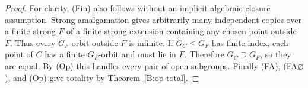 \begin{proof}
For clarity, (Fin) also follows without an implicit algebraic-closure
assumption. Strong amalgamation gives arbitrarily many independent
copies over a finite strong $F$ of a finite strong extension containing
any chosen point outside $F$. Thus every $G_F$-orbit outside $F$ is
infinite. If $G_C\leq G_F$ has finite index, each point of $C$ has a
finite $G_F$-orbit and must lie in $F$. Therefore $G_C\supseteq G_F$,
so they are equal. By (Op) this handles every pair of open subgroups.
Finally (FA), (FA$\varnothing$), and (Op) give totality by
Theorem~\ref{B:op-total}.
\end{proof}

